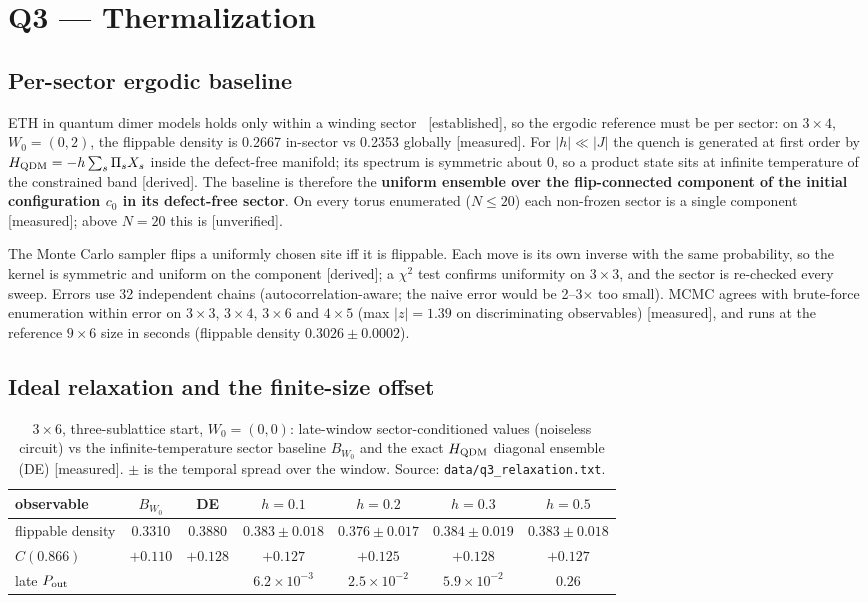 \documentclass[11pt,a4paper]{article}
\newcommand{\tg}[1]{\textsf{\small[#1]}}
\newcommand{\est}{\tg{established}}
\newcommand{\der}{\tg{derived}}
\newcommand{\mea}{\tg{measured}}
\newcommand{\unv}{\tg{unverified}}
\newcommand{\code}[1]{\nolinkurl{#1}}
\begin{document}
\section{Q3 --- Thermalization}\label{sec:q3}

\subsection{Per-sector ergodic baseline}
ETH in quantum dimer models holds only within a winding sector~\cite{lanpowell} \est, so the ergodic reference must
be per sector: on $3\times4$, $W_0=(0,2)$, the flippable density is 0.2667 in-sector vs 0.2353 globally \mea.
For $|h|\ll|J|$ the quench is generated at first order by $H_{\rm QDM}=-h\sum_s\Pi_sX_s$ inside the defect-free
manifold; its spectrum is symmetric about 0, so a product state sits at infinite temperature of the constrained
band \der. The baseline is therefore the \textbf{uniform ensemble over the flip-connected component of the initial
configuration $c_0$ in its defect-free sector}. On every torus enumerated ($N\le20$) each non-frozen sector is a
single component \mea; above $N=20$ this is \unv.

The Monte Carlo sampler flips a uniformly chosen site iff it is flippable. Each move is its own inverse with the same
probability, so the kernel is symmetric and uniform on the component \der; a $\chi^2$ test confirms uniformity on
$3\times3$, and the sector is re-checked every sweep. Errors use 32 independent chains (autocorrelation-aware; the
naive error would be 2--3$\times$ too small). MCMC agrees with brute-force enumeration within error on $3\times3$,
$3\times4$, $3\times6$ and $4\times5$ (max $|z|=1.39$ on discriminating observables) \mea, and runs at the
reference $9\times6$ size in seconds (flippable density $0.3026\pm0.0002$).

\subsection{Ideal relaxation and the finite-size offset}
\begin{table}[h]\centering\small
\caption{$3\times6$, three-sublattice start, $W_0=(0,0)$: late-window sector-conditioned values (noiseless
circuit) vs the infinite-temperature sector baseline $B_{W_0}$ and the exact $H_{\rm QDM}$ diagonal ensemble
(DE) \mea. $\pm$ is the temporal spread over the window. Source: \code{data/q3_relaxation.txt}.}\label{tab:q3}
\begin{tabular}{lcccccc}
\toprule
observable & $B_{W_0}$ & DE & $h=0.1$ & $h=0.2$ & $h=0.3$ & $h=0.5$\\
\midrule
flippable density & 0.3310 & 0.3880 & $0.383\pm0.018$ & $0.376\pm0.017$ & $0.384\pm0.019$ & $0.383\pm0.018$\\
$C(0.866)$ & $+0.110$ & $+0.128$ & $+0.127$ & $+0.125$ & $+0.128$ & $+0.127$\\
late $P_{\rm out}$ & & & $6.2\times10^{-3}$ & $2.5\times10^{-2}$ & $5.9\times10^{-2}$ & $\mathbf{0.26}$\\
\bottomrule
\end{tabular}
\end{table}
\end{document}
